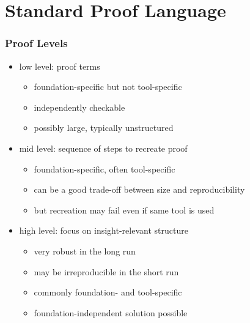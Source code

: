 \documentclass{beamer}
\begin{document}
\section{Standard Proof Language}

\begin{frame}\frametitle{Proof Levels}
\begin{itemize}
 \item low level: proof terms
 \begin{itemize}
 \item foundation-specific but not tool-specific
 \item independently checkable
 \item possibly large, typically unstructured
 \end{itemize}
 \item mid level: sequence of steps to recreate proof
 \begin{itemize}
 \item foundation-specific, often tool-specific
 \item can be a good trade-off between size and reproducibility
 \item but recreation may fail even if same tool is used
 \end{itemize}
 \item high level: focus on insight-relevant structure
 \begin{itemize}
 \item very robust in the long run
 \item may be irreproducible in the short run
 \item commonly foundation- and tool-specific
 \item foundation-independent solution possible
 \end{itemize}
\end{itemize}
\end{frame}

\newcommand{\kw}[1]{\mathbf{#1}}
\end{document}
